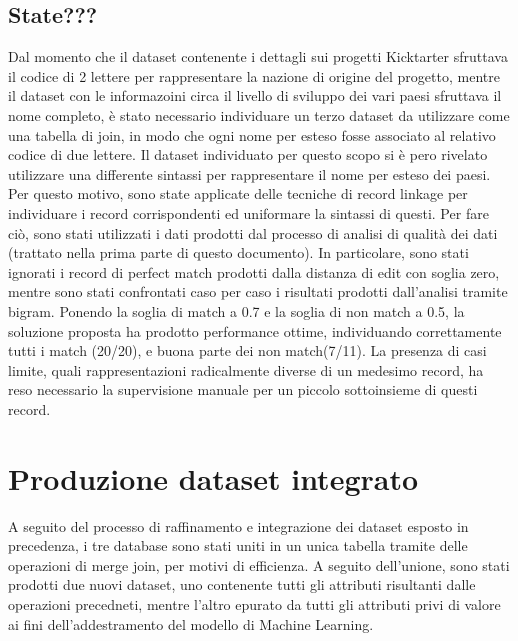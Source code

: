 \subsection{State???}
Dal momento che il dataset contenente i dettagli sui progetti Kicktarter sfruttava il codice di 2 lettere per rappresentare la nazione di origine del progetto, mentre il dataset con le informazoini circa il livello di sviluppo dei vari paesi sfruttava il nome completo, è stato necessario individuare un terzo dataset da utilizzare come una tabella di join, in modo che ogni nome per esteso fosse associato al relativo codice di due lettere. Il dataset individuato per questo scopo si è pero rivelato utilizzare una differente sintassi per rappresentare il nome per esteso dei paesi. Per questo motivo, sono state applicate delle tecniche di record linkage per individuare i record corrispondenti ed uniformare la sintassi di questi. Per fare ciò, sono stati utilizzati i dati prodotti dal processo di analisi di qualità dei dati (trattato nella prima parte di questo documento). In particolare, sono stati ignorati i record di perfect match prodotti dalla distanza di edit con soglia zero, mentre sono stati confrontati caso per caso i risultati prodotti dall'analisi tramite bigram. Ponendo la soglia di match a 0.7 e la soglia di non match a 0.5, la soluzione proposta ha prodotto performance ottime, individuando correttamente tutti i match (20/20), e buona parte dei non match(7/11). La presenza di casi limite, quali rappresentazioni radicalmente diverse di un medesimo record, ha reso necessario la supervisione manuale per un piccolo sottoinsieme di questi record.\\

\section{Produzione dataset integrato}
A seguito del processo di raffinamento e integrazione dei dataset esposto in precedenza, i tre database sono stati uniti in un unica tabella tramite delle operazioni di merge join, per motivi di efficienza. A seguito dell'unione, sono stati prodotti due nuovi dataset, uno contenente tutti gli attributi risultanti dalle operazioni precedneti, mentre l'altro epurato da tutti gli attributi privi di valore ai fini dell'addestramento del modello di Machine Learning.